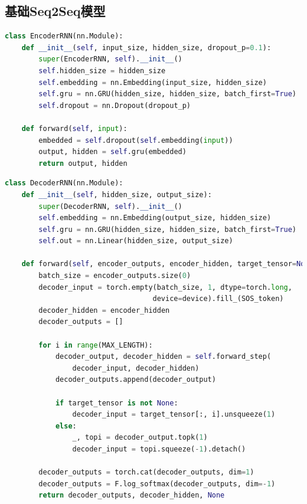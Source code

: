 \documentclass[a4paper]{article}
\begin{document}
\subsection{基础Seq2Seq模型}
\begin{lstlisting}[language=Python, caption=编码器实现]
class EncoderRNN(nn.Module):
    def __init__(self, input_size, hidden_size, dropout_p=0.1):
        super(EncoderRNN, self).__init__()
        self.hidden_size = hidden_size
        self.embedding = nn.Embedding(input_size, hidden_size)
        self.gru = nn.GRU(hidden_size, hidden_size, batch_first=True)
        self.dropout = nn.Dropout(dropout_p)

    def forward(self, input):
        embedded = self.dropout(self.embedding(input))
        output, hidden = self.gru(embedded)
        return output, hidden
\end{lstlisting}

\begin{lstlisting}[language=Python, caption=基础解码器实现]
class DecoderRNN(nn.Module):
    def __init__(self, hidden_size, output_size):
        super(DecoderRNN, self).__init__()
        self.embedding = nn.Embedding(output_size, hidden_size)
        self.gru = nn.GRU(hidden_size, hidden_size, batch_first=True)
        self.out = nn.Linear(hidden_size, output_size)

    def forward(self, encoder_outputs, encoder_hidden, target_tensor=None):
        batch_size = encoder_outputs.size(0)
        decoder_input = torch.empty(batch_size, 1, dtype=torch.long, 
                                   device=device).fill_(SOS_token)
        decoder_hidden = encoder_hidden
        decoder_outputs = []

        for i in range(MAX_LENGTH):
            decoder_output, decoder_hidden = self.forward_step(
                decoder_input, decoder_hidden)
            decoder_outputs.append(decoder_output)

            if target_tensor is not None:
                decoder_input = target_tensor[:, i].unsqueeze(1)
            else:
                _, topi = decoder_output.topk(1)
                decoder_input = topi.squeeze(-1).detach()

        decoder_outputs = torch.cat(decoder_outputs, dim=1)
        decoder_outputs = F.log_softmax(decoder_outputs, dim=-1)
        return decoder_outputs, decoder_hidden, None
\end{lstlisting}
\end{document}
